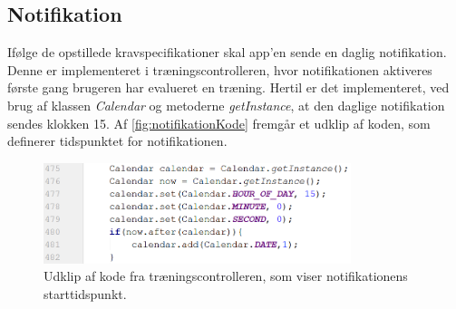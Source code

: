 \subsection{Notifikation}
Ifølge de opstillede kravspecifikationer skal app'en sende en daglig notifikation. Denne er implementeret i træningscontrolleren, hvor notifikationen aktiveres første gang brugeren har evalueret en træning. Hertil er det implementeret, ved brug af klassen \textit{Calendar} og metoderne \textit{getInstance}, at den daglige notifikation sendes klokken 15. Af \autoref{fig:notifikationKode} fremgår et udklip af koden, som definerer tidspunktet for notifikationen. 

\begin{figure} [H]
\centering
\includegraphics[width=0.8\textwidth]{figures/imple/notifikationKode}
\caption{Udklip af kode fra træningscontrolleren, som viser notifikationens starttidspunkt.}
\label{fig:notifikationKode}
\end{figure} 
